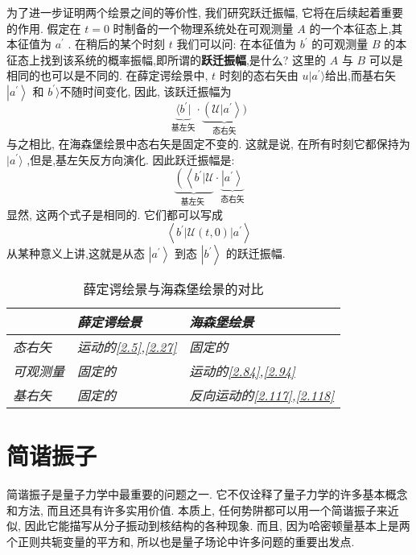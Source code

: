 \documentclass[lang=cn,newtx,10pt,scheme=chinese,thmcnt=section]{elegantbook}
\begin{document}
为了进一步证明两个绘景之间的等价性, 我们研究跃迁振幅, 它将在后续起着重要的作用. 假定在 $t = 0$ 时制备的一个物理系统处在可观测量 $A$ 的一个本征态上,其本征值为 ${a}^{\prime }$ . 在稍后的某个时刻 $t$ 我们可以问: 在本征值为 ${b}^{\prime }$ 的可观测量 $B$ 的本征态上找到该系统的概率振幅,即所谓的\textbf{跃迁振幅},是什么? 这里的 $A$ 与 $B$ 可以是相同的也可以是不同的. 在薛定谔绘景中, $t$ 时刻的态右矢由 $u | {a}^{\prime }\rangle$给出,而基右矢 $\left| {a}^{\prime }\right\rangle$ 和 ${b}^{\prime }\rangle$不随时间变化, 因此, 该跃迁振幅为
\begin{equation}
	\underset{\text{基左矢}}{\underbrace{\langle b^\prime |}} \cdot \underset{\text{态右矢}}{\underbrace{\left(\mathcal{U}| {a}^{\prime }\right\rangle )}}
\end{equation}
与之相比, 在海森堡绘景中态右矢是固定不变的. 这就是说, 在所有时刻它都保持为$|{a}^{\prime }\rangle$ ,但是,基左矢反方向演化. 因此跃迁振幅是:
\begin{equation}
	\underset{\text{基左矢 }}{\underbrace{\left( \left\langle {b}^{\prime } | \mathcal{U}\right. \right. }} \cdot \underset{\text{态右矢}}{\underbrace{\left| {a}^{\prime }\right\rangle}}
\end{equation}
显然, 这两个式子是相同的. 它们都可以写成
\begin{equation}
	\left\langle {{b}^{\prime }\left| {\mathcal{U}\left( {t,0}\right) }\right| {a}^{\prime }}\right\rangle
\end{equation}
从某种意义上讲,这就是从态 $\left| {a}^{\prime }\right\rangle$ 到态 $\left| {b}^{\prime }\right\rangle$ 的跃迁振幅.
\begin{table}[htbq]
	\caption{薛定谔绘景与海森堡绘景的对比}
	\centering
	\begin{tabular}{l|l|l}
		\hline
		& \textit{薛定谔绘景} & \textit{海森堡绘景} \\ \hline
		\textit{态右矢} & \textit{运动的\ref{2.5},\ref{2.27}} & \textit{固定的} \\
		\textit{可观测量} & \textit{固定的} & \textit{运动的\ref{2.84},\ref{2.94}} \\
		\textit{基右矢} & \textit{固定的} & \textit{反向运动的\ref{2.117},\ref{2.118}} \\ \hline
	\end{tabular}
\end{table}
\section{简谐振子}
简谐振子是量子力学中最重要的问题之一. 它不仅诠释了量子力学的许多基本概念和方法, 而且还具有许多实用价值. 本质上, 任何势阱都可以用一个简谐振子来近似, 因此它能描写从分子振动到核结构的各种现象. 而且, 因为哈密顿量基本上是两个正则共轭变量的平方和, 所以也是量子场论中许多问题的重要出发点.
\end{document}

